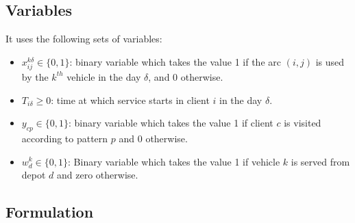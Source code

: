 \documentclass[preprint,review,12pt]{elsarticle}
\begin{document}
\subsection{Variables}
It uses the following sets of variables:

\begin{itemize}
	\item  $x_{ij}^{k\delta}  \in  \{ 0,1 \}$: binary variable which takes the value 1 if the arc $(i,j)$ is used by the $k^{th}$ vehicle in the day $\delta$, and 0 otherwise. 
	\item $T_{i\delta} \geq 0$: time at which service starts in client $i$ in the day $\delta$. 
	\item $y_{cp} \in  \{ 0,1 \}$: binary variable which takes the value 1 if client $c$ is visited according to pattern $p$ and 0 otherwise.
	\item  $w_d^k \in  \{0,1\}$: Binary variable which takes the value 1 if vehicle $k$ is served from depot $d$ and zero otherwise.
\end{itemize}

\subsection{Formulation}
\end{document}
